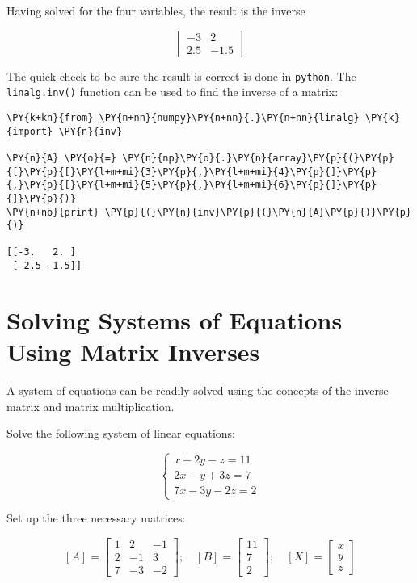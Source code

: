 Having solved for the four variables, the result is the inverse

\[
\begin{bmatrix}
−3 & 2\\
2.5 & −1.5
\end{bmatrix}
\]

The quick check to be sure the result is correct is done in \texttt{python}.
The \texttt{linalg.inv()} function can be used to find the inverse of a
matrix:

    \begin{tcolorbox}[breakable, size=fbox, boxrule=1pt, pad at break*=1mm,colback=cellbackground, colframe=cellborder]
\begin{Verbatim}[commandchars=\\\{\}]
\PY{k+kn}{from} \PY{n+nn}{numpy}\PY{n+nn}{.}\PY{n+nn}{linalg} \PY{k}{import} \PY{n}{inv}

\PY{n}{A} \PY{o}{=} \PY{n}{np}\PY{o}{.}\PY{n}{array}\PY{p}{(}\PY{p}{[}\PY{p}{[}\PY{l+m+mi}{3}\PY{p}{,}\PY{l+m+mi}{4}\PY{p}{]}\PY{p}{,}\PY{p}{[}\PY{l+m+mi}{5}\PY{p}{,}\PY{l+m+mi}{6}\PY{p}{]}\PY{p}{]}\PY{p}{)}
\PY{n+nb}{print} \PY{p}{(}\PY{n}{inv}\PY{p}{(}\PY{n}{A}\PY{p}{)}\PY{p}{)}

[[-3.   2. ]
 [ 2.5 -1.5]]
    \end{Verbatim}
\end{tcolorbox}

\section{Solving Systems of Equations Using Matrix Inverses}\label{solving-systems-of-equations-using-matrix-inverses}

A system of equations can be readily solved using the concepts of the
inverse matrix and matrix multiplication.

Solve the following system of linear equations:

\[
\begin{cases}
x+2y-z=11\\
2x-y+3z=7\\
7x-3y-2z=2
\end{cases}
\]

Set up the three necessary matrices:

\[[A]=
\begin{bmatrix}
1 & 2 & -1 \\ 
2 & -1 & 3 \\
7 & -3 & -2
\end{bmatrix}
;\quad
[B]=
\begin{bmatrix}
11\\
7\\
2
\end{bmatrix}
;\quad
[X]=
\begin{bmatrix}
x\\
y \\ 
z
\end{bmatrix}
\]

